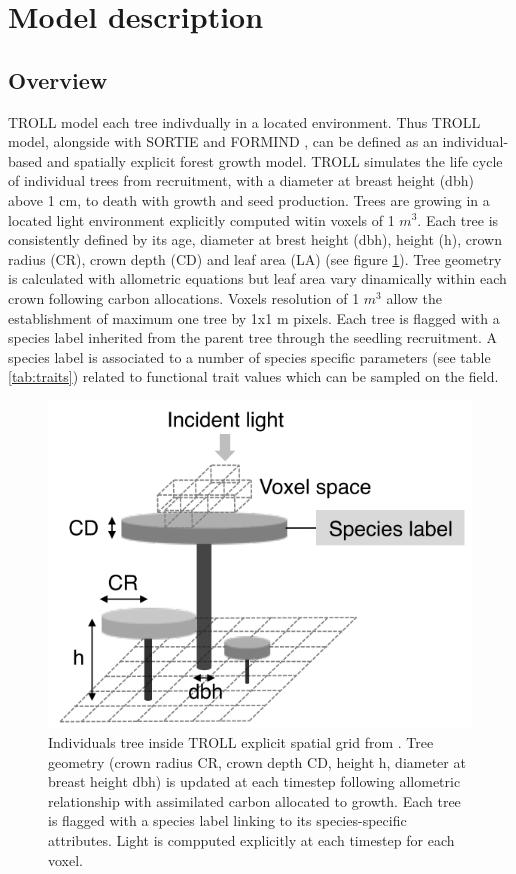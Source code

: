 \documentclass[12pt,]{article}
\let\oldsection\section
\renewcommand\section{\newpage\oldsection}
\theoremstyle{definition}
\theoremstyle{definition}
\theoremstyle{remark}
\begin{document}
\section{Model description}\label{model-description}

\subsection{Overview}\label{overview}

TROLL model each tree indivdually in a located environment. Thus TROLL
model, alongside with SORTIE \citep{Pacala1996, Uriarte2009} and FORMIND
\citep{Fischer2016, Kohler1998}, can be defined as an individual-based
and spatially explicit forest growth model. TROLL simulates the life
cycle of individual trees from recruitment, with a diameter at breast
height (dbh) above 1 cm, to death with growth and seed production. Trees
are growing in a located light environment explicitly computed witin
voxels of 1 \(m^3\). Each tree is consistently defined by its age,
diameter at brest height (dbh), height (h), crown radius (CR), crown
depth (CD) and leaf area (LA) (see figure \ref{fig:TROLLtree}). Tree
geometry is calculated with allometric equations but leaf area vary
dinamically within each crown following carbon allocations. Voxels
resolution of 1 \(m^3\) allow the establishment of maximum one tree by
1x1 m pixels. Each tree is flagged with a species label inherited from
the parent tree through the seedling recruitment. A species label is
associated to a number of species specific parameters (see table
\ref{tab:traits}) related to functional trait values which can be
sampled on the field.

\begin{figure}[htbp]
\centering
\includegraphics{images/TROLLtree.png}
\caption{\label{fig:TROLLtree}Individuals tree inside TROLL explicit spatial
grid from \citet{Li}. Tree geometry (crown radius CR, crown depth CD,
height h, diameter at breast height dbh) is updated at each timestep
following allometric relationship with assimilated carbon allocated to
growth. Each tree is flagged with a species label linking to its
species-specific attributes. Light is compputed explicitly at each
timestep for each voxel.}
\end{figure}
\end{document}
